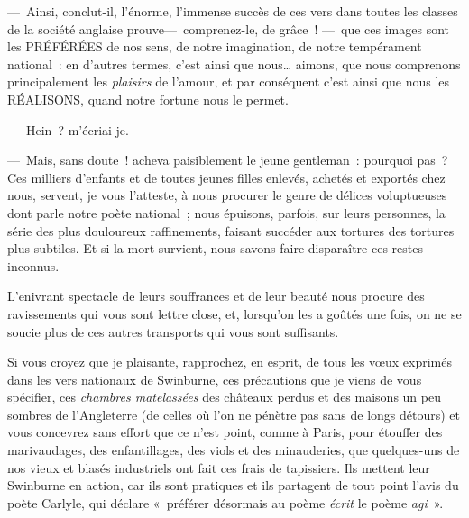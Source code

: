 \documentclass[french,twoside]{book} %
\begin{document}
— Ainsi, conclut-il, l’énorme, l’immense succès   de ces vers dans toutes les classes de la société anglaise prouve— comprenez-le, de grâce ! — que ces images sont les PRÉFÉRÉES de nos sens, de notre imagination, de notre tempérament national : en d’autres termes, c’est ainsi que nous… aimons, que nous comprenons principalement les \emph{plaisirs} de l’amour, et par conséquent c’est ainsi que nous les RÉALISONS, quand notre fortune nous le permet.\par
— Hein ? m’écriai-je.\par
— Mais, sans doute ! acheva paisiblement le jeune gentleman : pourquoi pas ? Ces milliers d’enfants et de toutes jeunes filles enlevés, achetés et exportés chez nous, servent, je vous l’atteste, à nous procurer le genre de délices voluptueuses dont parle notre poète national ; nous épuisons, parfois, sur leurs personnes, la série des plus douloureux raffinements, faisant succéder aux tortures des tortures plus subtiles. Et si la mort survient, nous savons faire disparaître ces restes inconnus.\par
L’enivrant spectacle de leurs souffrances et de leur beauté nous procure des ravissements   qui vous sont lettre close, et, lorsqu’on les a goûtés une fois, on ne se soucie plus de ces autres transports qui vous sont suffisants.\par
Si vous croyez que je plaisante, rapprochez, en esprit, de tous les vœux exprimés dans les vers nationaux de Swinburne, ces précautions que je viens de vous spécifier, ces \emph{chambres matelassées} des châteaux perdus et des maisons un peu sombres de l’Angleterre (de celles où l’on ne pénètre pas sans de longs détours) et vous concevrez sans effort que ce n’est point, comme à Paris, pour étouffer des marivaudages, des enfantillages, des viols et des minauderies, que quelques-uns de nos vieux et blasés industriels ont fait ces frais de tapissiers. Ils mettent leur Swinburne en action, car ils sont pratiques et ils partagent de tout point l’avis du poète Carlyle, qui déclare « préférer désormais au poème \emph{écrit} le poème \emph{agi} ».\par
\end{document}
